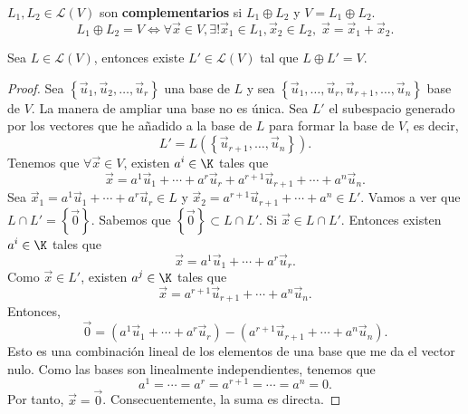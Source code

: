 \begin{fdefinition}[]
	\normalfont $\displaystyle L_{1}, L_{2} \in \mathcal{L}\left(V\right) $ son \textbf{complementarios} si $\displaystyle L_{1} \oplus L_{2} $ y $\displaystyle V = L_{1} \oplus L_{2} $. 
	\[L_{1}\oplus L_{2} = V \iff \forall\vec{x}\in V, \exists! \vec{x}_{1}\in L_{1}, \vec{x}_{2}\in L_{2}, \; \vec{x} = \vec{x}_{1} + \vec{x}_{2} .\]	
\end{fdefinition}

\begin{ftheorem}[]
\normalfont Sea $\displaystyle L \in \mathcal{L}\left(V\right) $, entonces existe $\displaystyle L' \in \mathcal{L}\left(V\right) $ tal que $\displaystyle L \oplus L' = V $.
\end{ftheorem}

\begin{proof}
	Sea $\displaystyle \left\{ \vec{u}_{1}, \vec{u}_{2}, \ldots, \vec{u}_{r}\right\}  $ una base de $\displaystyle L $ y sea $\displaystyle \left\{ \vec{u}_{1}, \ldots, \vec{u}_{r}, \vec{u}_{r+1}, \ldots, \vec{u}_{n}\right\}  $ base de $\displaystyle V $. La manera de ampliar una base no es única. Sea $\displaystyle L' $ el subespacio generado por los vectores que he añadido a la base de $\displaystyle L $ para formar la base de $\displaystyle V $, es decir, 
	\[L' = L(\left\{ \vec{u}_{r+1}, \ldots, \vec{u}_{n}\right\})  .\]
Tenemos que $\displaystyle \forall \vec{x}\in V $, existen $\displaystyle a^{i}\in\K $ tales que 
\[\vec{x} = a^{1}\vec{u}_{1}+ \cdots + a^{r}\vec{u}_{r} + a^{r+1}\vec{u}_{r+1} +\cdots + a^{n}\vec{u}_{n} .\]
Sea $\displaystyle \vec{x}_{1} = a^{1}\vec{u}_{1}+ \cdots + a^{r}\vec{u}_{r} \in L $ y $\displaystyle \vec{x}_{2} = a^{r+1}\vec{u}_{r+1} +\cdots + a^{n} \in L' $. Vamos a ver que $\displaystyle L \cap L' = \left\{ \vec{0}\right\}  $. Sabemos que $\displaystyle \left\{ \vec{0}\right\} \subset L \cap L' $. Si $\displaystyle \vec{x}\in L\cap L' $. Entonces existen $\displaystyle a^{i}\in\K $ tales que
\[\vec{x} = a^{1}\vec{u}_{1} + \cdots + a^{r}\vec{u}_{r} .\]
Como $\displaystyle \vec{x}\in L' $, existen $\displaystyle a^{j} \in \K $ tales que 
\[\vec{x} = a^{r+1} \vec{u}_{r+1} + \cdots + a^{n}\vec{u}_{n} .\]
Entonces, 
\[\vec{0} = \left(a^{1}\vec{u}_{1} + \cdots + a^{r}\vec{u}_{r}\right) - \left(a^{r+1} \vec{u}_{r+1} + \cdots + a^{n}\vec{u}_{n}\right) .\]
Esto es una combinación lineal de los elementos de una base que me da el vector nulo. Como las bases son linealmente independientes, tenemos que 
\[a^{1} = \cdots = a^{r} = a^{r+1} = \cdots = a^{n} = 0 .\]
Por tanto, $\displaystyle \vec{x} = \vec{0} $. Consecuentemente, la suma es directa. 
\end{proof}


